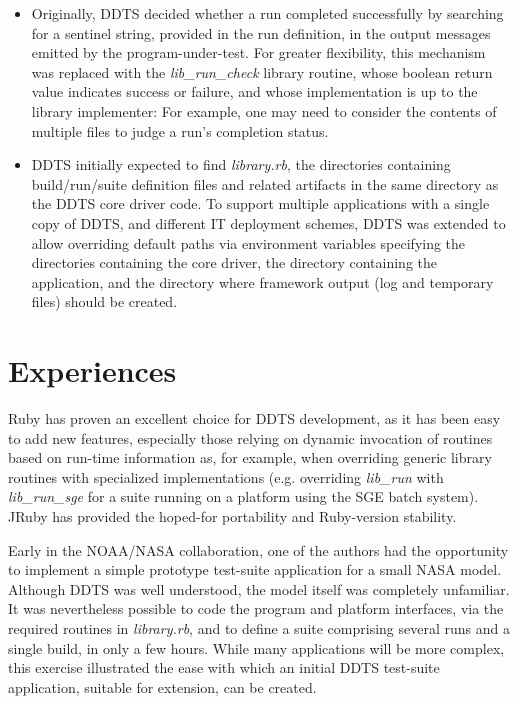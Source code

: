 \documentclass[conference]{IEEEtran}
\begin{document}
\begin{itemize}
\item Originally, DDTS decided whether a run completed successfully by searching for a sentinel string, provided in the run definition, in the output messages emitted by the program-under-test. For greater flexibility, this mechanism was replaced with the \emph{lib\_run\_check} library routine, whose boolean return value indicates success or failure, and whose implementation is up to the library implementer: For example, one may need to consider the contents of multiple files to judge a run's completion status.
\item DDTS initially expected to find \emph{library.rb}, the directories containing build/run/suite definition files and related artifacts in the same directory as the DDTS core driver code. To support multiple applications with a single copy of DDTS, and different IT deployment schemes, DDTS was extended to allow overriding default paths via environment variables specifying the directories containing the core driver, the directory containing the application, and the directory where framework output (log and temporary files) should be created.
\end{itemize}

\section{Experiences}

Ruby has proven an excellent choice for DDTS development, as it has been easy to add new features, especially those relying on dynamic invocation of routines based on run-time information as, for example, when overriding generic library routines with specialized implementations (e.g. overriding \emph{lib\_run} with \emph{lib\_run\_sge} for a suite running on a platform using the SGE batch system). JRuby has provided the hoped-for portability and Ruby-version stability.

Early in the NOAA/NASA collaboration, one of the authors had the opportunity to implement a simple prototype test-suite application for a small NASA model. Although DDTS was well understood, the model itself was completely unfamiliar. It was nevertheless possible to code the program and platform interfaces, via the required routines in \emph{library.rb}, and to define a suite comprising several runs and a single build, in only a few hours. While many applications will be more complex, this exercise illustrated the ease with which an initial DDTS test-suite application, suitable for extension, can be created.
\end{document}
